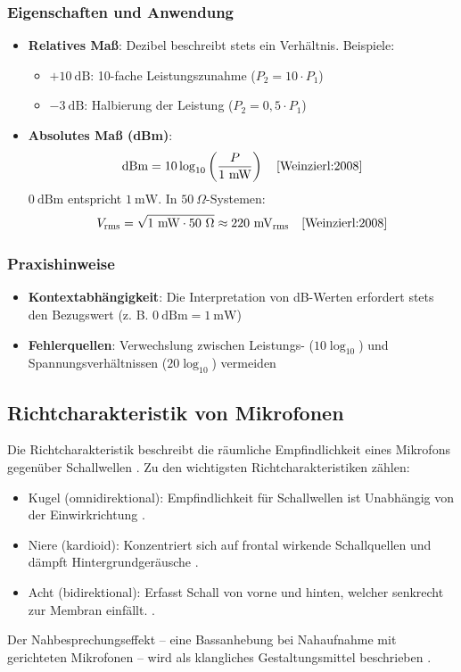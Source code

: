 \subsubsection{Eigenschaften und Anwendung}
\begin{itemize}
	\item \textbf{Relatives Maß}: Dezibel beschreibt stets ein Verhältnis. Beispiele:
	\begin{itemize}
		\item \(+10\ \text{dB}\): 10-fache Leistungszunahme (\(P_2 = 10 \cdot P_1\)) \cite{Weinzierl:2008}
		\item \(-3\ \text{dB}\): Halbierung der Leistung (\(P_2 = 0{,}5 \cdot P_1\)) \cite{Weinzierl:2008}
	\end{itemize}
	
	\item \textbf{Absolutes Maß (dBm)}:
	\[
	\text{dBm} = 10 \log_{10} \left( \frac{P}{1\ \text{mW}} \right) \quad \text{\cite{Weinzierl:2008}}
	\]
	\(0\ \text{dBm}\) entspricht \(1\ \text{mW}\). In \(50\ \Omega\)-Systemen:
	\[
	V_{\text{rms}} = \sqrt{1\ \text{mW} \cdot 50\ \Omega} \approx 220\ \text{mV}_{\text{rms}} \quad \text{\cite{Weinzierl:2008}}
	\]
\end{itemize}

\subsubsection{Praxishinweise}
\begin{itemize}
	\item \textbf{Kontextabhängigkeit}: Die Interpretation von dB-Werten erfordert stets den Bezugswert (z. B. \(0\ \text{dBm} = 1\ \text{mW}\)) \cite{Weinzierl:2008}
	\item \textbf{Fehlerquellen}: Verwechslung zwischen Leistungs- (\(10 \log_{10}\)) und Spannungsverhältnissen (\(20 \log_{10}\)) vermeiden \cite{Weinzierl:2008}
\end{itemize}

\bigskip

\subsection{Richtcharakteristik von Mikrofonen}
Die Richtcharakteristik beschreibt die räumliche Empfindlichkeit eines Mikrofons gegenüber Schallwellen \cite{Weinzierl:2008}. Zu den wichtigsten Richtcharakteristiken zählen:
\begin{itemize}
	\item Kugel (omnidirektional): Empfindlichkeit für Schallwellen ist Unabhängig von der Einwirkrichtung \cite{Bernstein:2019a}.
	\item Niere (kardioid): Konzentriert sich auf frontal wirkende Schallquellen und dämpft Hintergrundgeräusche \cite{Bernstein:2019a}.
	\item Acht (bidirektional): Erfasst Schall von vorne und hinten, welcher senkrecht zur Membran einfällt. \cite{Weinzierl:2008}\cite{Bernstein:2019a}.
\end{itemize}
Der Nahbesprechungseffekt – eine Bassanhebung bei Nahaufnahme mit gerichteten Mikrofonen – wird als klangliches Gestaltungsmittel beschrieben \cite{Weinzierl:2008}.

